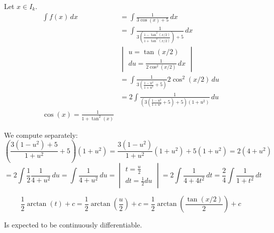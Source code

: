 \documentclass{article}
\begin{document}
Let $x \in I_k$.
\begin{align*}
  \int f(x) \, dx
    &= \int \frac{1}{3 \cos(x) + 5} \, dx \\
    &= \int \frac{1}{3 \left(\frac{1 - \tan^2(x/2)}{1 + \tan^2(x/2)}\right) + 5} \, dx \\
    &\begin{vmatrix} u = \tan(x/2) \\ du = \frac{1}{2 \cos^2(x/2)} \, dx \end{vmatrix} \\
    &= \int \frac{1}{3 \left(\frac{1 - u^2}{1 + u^2} + 5\right)} 2 \cos^2(x/2) \, du \\
    &= 2 \int \frac{1}{\left(3 \left(\frac{1 - u^2}{1 + u^2} + 5\right) + 5\right)\left(1 + u^2\right)} \, du \\
  \cos(x) = \frac{1}{1 + \tan^2(x)}
\end{align*}

We compute separately:
\[
  \left(\frac{3 (1 - u^2) + 5}{1 + u^2} + 5\right)(1 + u^2) = \frac{3 (1 - u^2)}{1 + u^2} (1 + u^2) + 5(1 + u^2) = 2 (4 + u^2)
\] \[
  = 2 \int \frac12 \frac{1}{4 + u^2} \, du = \int \frac{1}{4 + u^2} \, du = \begin{vmatrix} t = \frac u2 \\ dt = \frac12 du \end{vmatrix}
  = 2 \int \frac{1}{4 + 4 t^2} \, dt = \frac24 \int \frac{1}{1 + t^2} \, dt
\]

\[ \frac12 \arctan(t) + c = \frac12 \arctan\left(\frac u2\right) + c = \frac12 \arctan\left(\frac{\tan(x/2)}{2}\right) + c \]

Is expected to be continuously differentiable.
\end{document}
